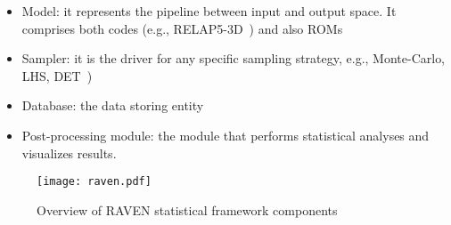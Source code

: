 \begin{itemize}
  \item Model: it represents the pipeline between input and output space. It comprises both codes 
        (e.g., RELAP5-3D~\cite{relap5}) and also ROMs 
  \item Sampler: it is the driver for any specific sampling strategy, e.g., Monte-Carlo, LHS, 
        DET~\cite{ANS2014_adaptDET,PSA2013_Raven})
  \item Database: the data storing entity
  \item Post-processing module: the module that performs statistical analyses and visualizes results.
\end{itemize}

\begin{figure}
    \centering
    \centerline{\texttt{[image: raven.pdf]}} 
    \caption{Overview of RAVEN statistical framework components}
    \label{fig:ravenScheme}
\end{figure}

